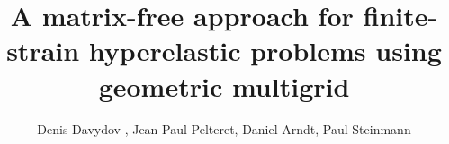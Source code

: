 \documentclass[times,doublespace]{nmeauth}
\begin{document}

\title{
  A matrix-free approach for finite-strain hyperelastic problems using geometric multigrid
  }

  \author{
    Denis Davydov \corrauth ,
    Jean-Paul Pelteret,
    Daniel Arndt,
    Paul Steinmann
  }

  \address{
    Chair of Applied Mechanics,
    Friedrich-Alexander-Universit\"{a}t Erlangen-N\"{u}rnberg,
    Egerlandstr.\ 5, 91058 Erlangen, Germany \break
    Interdisciplinary Center for Scientific Computing (IWR),
    Heidelberg University,
    Im Neuenheimer Feld 205, 69120 Heidelberg, Germany \break
    Glasgow Computational Engineering Center (GCEC),
        University of Glasgow, G12 8QQ Glasgow, United Kingdom \break
    }









\end{document}
